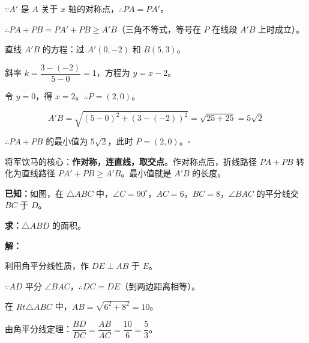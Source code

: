 \documentclass[12pt, a4paper]{ctexart}
\begin{document}
\(\because A'\) 是 \(A\) 关于 \(x\) 轴的对称点，\(\therefore PA = PA'\)。

\(\therefore PA + PB = PA' + PB \geq A'B\)（三角不等式，等号在 \(P\) 在线段 \(A'B\) 上时成立）。

直线 \(A'B\) 的方程：过 \(A'(0, -2)\) 和 \(B(5, 3)\)。

斜率 \(k = \dfrac{3 - (-2)}{5 - 0} = 1\)，方程为 \(y = x - 2\)。

令 \(y = 0\)，得 \(x = 2\)。\(\therefore P = (2, 0)\)。

\[A'B = \sqrt{(5-0)^2 + (3-(-2))^2} = \sqrt{25 + 25} = 5\sqrt{2}\]

\(\therefore PA + PB\) 的最小值为 \(5\sqrt{2}\)，此时 \(P = (2, 0)\)。\hfill\(\square\)

\begin{tipbox}[思路点拨]
将军饮马的核心：\textbf{作对称，连直线，取交点}。作对称点后，折线路径 \(PA + PB\) 转化为直线路径 \(PA' + PB \geq A'B\)。最小值就是 \(A'B\) 的长度。
\end{tipbox}

\begin{examplebox}[【例题 7-2】角平分线与对称]
\textbf{已知：}如图，在 \(\triangle ABC\) 中，\(\angle C = 90^\circ\)，\(AC = 6\)，\(BC = 8\)，\(\angle BAC\) 的平分线交 \(BC\) 于 \(D\)。

\textbf{求：}\(\triangle ABD\) 的面积。
\end{examplebox}

\noindent\textbf{解：}

\begin{center}
\end{center}

利用角平分线性质，作 \(DE \perp AB\) 于 \(E\)。

\(\because AD\) 平分 \(\angle BAC\)，\(\therefore DC = DE\)（到两边距离相等）。

在 \(Rt\triangle ABC\) 中，\(AB = \sqrt{6^2 + 8^2} = 10\)。

由角平分线定理：\(\dfrac{BD}{DC} = \dfrac{AB}{AC} = \dfrac{10}{6} = \dfrac{5}{3}\)。
\end{document}

